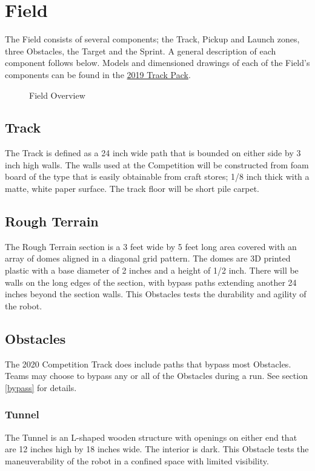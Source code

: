 \section{Field}
The Field consists of several components; the Track, Pickup and Launch zones, three Obstacles, the Target and the Sprint. A general description of each component follows below. Models and dimensioned drawings of each of the Field’s components can be found in the {\col\href{https://mercury.okstate.edu/content/mercury-challenge}{2019 Track Pack}}.

\begin{figure}[H]
	\centering
	\caption{Field Overview}
	\label{fig:field} 
\end{figure}

\subsection{Track}
The Track is defined as a 24 inch wide path that is bounded on either side by 3 inch high walls. The walls used at the Competition will be constructed from foam board of the type that is easily obtainable from craft stores; 1/8 inch thick with a matte, white paper surface. The track floor will be short pile carpet.

\subsection{Rough Terrain}
The Rough Terrain section is a 3 feet wide by 5 feet long area covered with an array of domes aligned in a diagonal grid pattern. The domes are 3D printed plastic with a base diameter of 2 inches and a height of 1/2 inch. There will be walls on the long edges of the section, with bypass paths extending another 24 inches beyond the section walls. This Obstacles tests the durability and agility of the robot.

\subsection{Obstacles}
The 2020 Competition Track does include paths that bypass most Obstacles. Teams may choose to bypass any or all of the Obstacles during a run. See section \ref{bypass} for details.

\subsubsection{Tunnel}
The Tunnel is an L-shaped wooden structure with openings on either end that are 12 inches high by 18 inches wide. The interior is dark. This Obstacle tests the maneuverability of the robot in a confined space with limited visibility.

